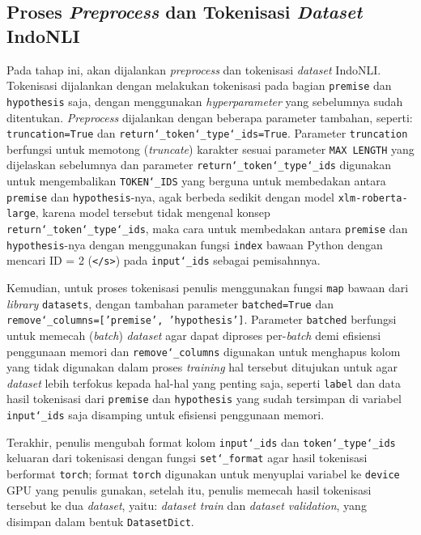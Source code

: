 \subsection{Proses \emph{Preprocess} dan Tokenisasi \emph{Dataset} IndoNLI}
\label{4.1.4}
Pada tahap ini, akan dijalankan  \emph{preprocess} dan tokenisasi \emph{dataset} IndoNLI. Tokenisasi dijalankan dengan melakukan tokenisasi pada bagian \texttt{premise} dan \texttt{hypothesis} saja, dengan menggunakan \emph{hyperparameter} yang sebelumnya sudah ditentukan. \emph{Preprocess} dijalankan dengan beberapa parameter tambahan, seperti: \texttt{truncation=True} dan \texttt{return\char`_token\char`_type\char`_ids=True}. Parameter \texttt{truncation} berfungsi untuk memotong (\emph{truncate}) karakter sesuai parameter \texttt{MAX LENGTH} yang dijelaskan sebelumnya dan parameter \texttt{return\char`_token\char`_type\char`_ids} digunakan untuk mengembalikan \texttt{TOKEN\char`_IDS} yang berguna untuk membedakan antara \texttt{premise} dan \texttt{hypothesis}-nya, agak berbeda sedikit dengan model \texttt{xlm-roberta-large}, karena model tersebut tidak mengenal konsep \texttt{return\char`_token\char`_type\char`_ids}, maka cara untuk membedakan antara \texttt{premise} dan \texttt{hypothesis}-nya dengan menggunakan fungsi \texttt{index} bawaan Python dengan mencari ID = 2 (\texttt{</s>}) pada \texttt{input\char`_ids} sebagai pemisahnnya. 

Kemudian, untuk proses tokenisasi penulis menggunakan fungsi \texttt{map} bawaan dari \emph{library} \texttt{datasets}, dengan tambahan parameter \texttt{batched=True} dan \texttt{remove\char`_columns=['premise', 'hypothesis']}. Parameter \texttt{batched} berfungsi untuk memecah (\emph{batch}) \emph{dataset} agar dapat diproses per-\emph{batch} demi efisiensi penggunaan memori dan \texttt{remove\char`_columns} digunakan untuk menghapus kolom yang tidak digunakan dalam proses \emph{training} hal tersebut ditujukan untuk agar \emph{dataset} lebih terfokus kepada hal-hal yang penting saja, seperti \texttt{label} dan data hasil tokenisasi dari \texttt{premise} dan   \texttt{hypothesis} yang sudah tersimpan di variabel \texttt{input\char`_ids} saja disamping untuk efisiensi penggunaan memori.

Terakhir, penulis mengubah format kolom \texttt{input\char`_ids} dan \texttt{token\char`_type\char`_ids} keluaran dari tokenisasi dengan fungsi \texttt{set\char`_format} agar hasil tokenisasi berformat \texttt{torch}; format \texttt{torch} digunakan untuk menyuplai variabel ke \texttt{device} GPU yang penulis gunakan, setelah itu, penulis memecah hasil tokenisasi tersebut ke dua \emph{dataset}, yaitu: \emph{dataset train} dan \emph{dataset validation}, yang disimpan dalam bentuk \texttt{DatasetDict}.

